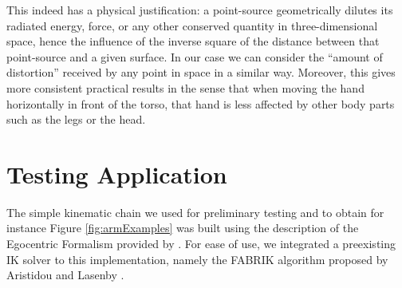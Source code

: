 This indeed has a physical justification: a point-source geometrically dilutes its radiated energy, force, or any other conserved quantity in three-dimensional space, hence the influence of the inverse square of the distance between that point-source and a given surface. In our case we can consider the ``amount of distortion'' received by any point in space in a similar way. Moreover, this gives more consistent practical results in the sense that when moving the hand horizontally in front of the torso, that hand is less affected by other body parts such as the legs or the head.

\section{Testing Application}
\label{sec:testingApp}
The simple kinematic chain we used for preliminary testing and to obtain for instance Figure \ref{fig:armExamples} was built using the description of the Egocentric Formalism provided by \cite{molla2016precise}. For ease of use, we integrated a preexisting IK solver to this implementation, namely the FABRIK algorithm proposed by Aristidou and Lasenby \cite{aristidou2011fabrik}.


